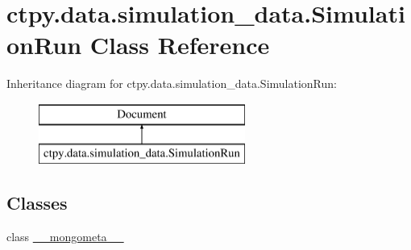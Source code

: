 \hypertarget{classctpy_1_1data_1_1simulation__data_1_1_simulation_run}{\section{ctpy.\-data.\-simulation\-\_\-data.\-Simulation\-Run Class Reference}
\label{classctpy_1_1data_1_1simulation__data_1_1_simulation_run}
}
Inheritance diagram for ctpy.\-data.\-simulation\-\_\-data.\-Simulation\-Run\-:\begin{figure}[H]
\begin{center}
\leavevmode
\includegraphics[height=2.000000cm]{classctpy_1_1data_1_1simulation__data_1_1_simulation_run}
\end{center}
\end{figure}
\subsection*{Classes}
\begin{DoxyCompactItemize}
\item 
class \hyperlink{classctpy_1_1data_1_1simulation__data_1_1_simulation_run_1_1____mongometa____}{\-\_\-\-\_\-mongometa\-\_\-\-\_\-}
\end{DoxyCompactItemize}
